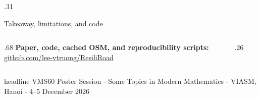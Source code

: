 \documentclass[final]{beamer}
\begin{document}
\begin{frame}[t]
\begin{columns}[t,totalwidth=.96\paperwidth]
\begin{column}{.31\paperwidth}
\begin{block}{Takeaway, limitations, and code}
\vspace{1cm}
\begin{columns}[c]
\begin{column}{.68\linewidth}
\textbf{Paper, code, cached OSM, and reproducibility scripts:}\\[.4cm]
\url{github.com/lee-vtruong/ResiliRoad}
\end{column}
\begin{column}{.26\linewidth}
\centering{}
\end{column}
\end{columns}
\end{block}
\end{column}
\end{columns}

\vfill
\begin{beamercolorbox}[wd=\paperwidth,sep=.8cm,center]{headline}
{\fontsize{20}{24}\selectfont VMS60 Poster Session - Some Topics in Modern Mathematics - VIASM, Hanoi - 4--5 December 2026}
\end{beamercolorbox}
\end{frame}
\end{document}
